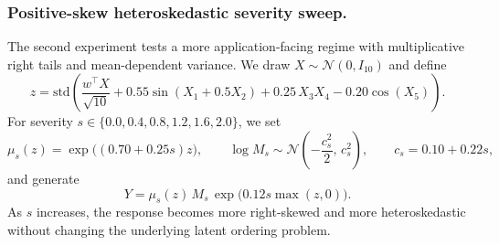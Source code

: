 \subsubsection{Positive-skew heteroskedastic severity sweep.}
The second experiment tests a more application-facing regime with multiplicative right tails and mean-dependent variance. We draw \(X \sim \mathcal{N}(0,I_{10})\) and define
\[
z=\mathrm{std}\!\left(
\frac{w^\top X}{\sqrt{10}}
+ 0.55\sin(X_1+0.5X_2)
+ 0.25\,X_3X_4
-0.20\cos(X_5)
\right).
\]
For severity \(s \in \{0.0,0.4,0.8,1.2,1.6,2.0\}\), we set
\[
\mu_s(z)=\exp\!\big((0.70+0.25s)z\big),
\qquad
\log M_s \sim \mathcal{N}\!\left(-\frac{c_s^2}{2},\,c_s^2\right),
\qquad
c_s=0.10+0.22s,
\]
and generate
\[
Y=\mu_s(z)\,M_s\,\exp\!\big(0.12s\max(z,0)\big).
\]
As \(s\) increases, the response becomes more right-skewed and more heteroskedastic without changing the underlying latent ordering problem.

